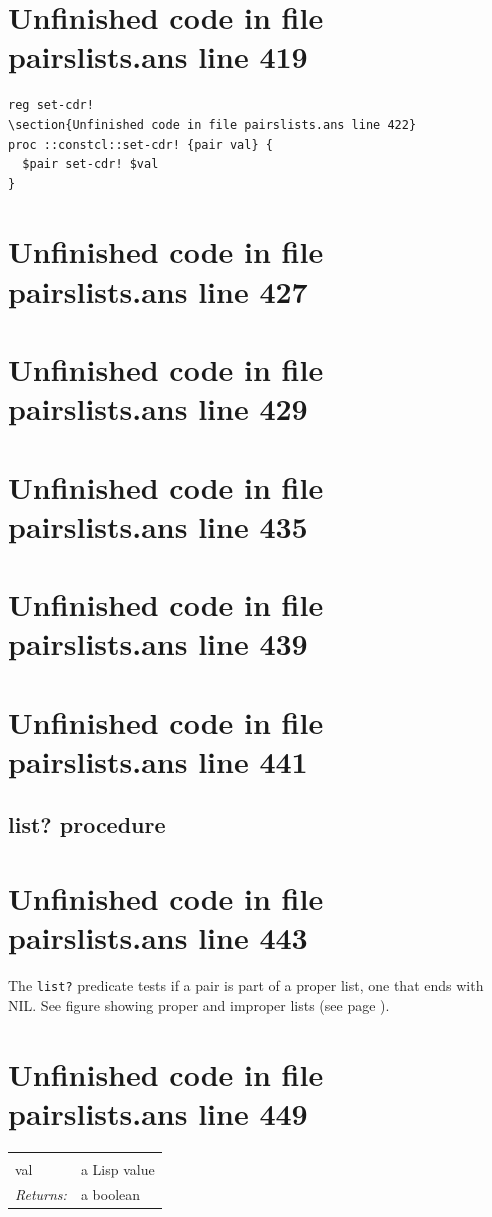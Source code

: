 \documentclass[twoside,9pt]{report}
\begin{document}
\section{Unfinished code in file pairslists.ans line 419}
\begin{lstlisting}
reg set-cdr!
\section{Unfinished code in file pairslists.ans line 422}
proc ::constcl::set-cdr! {pair val} {
  $pair set-cdr! $val
}
\end{lstlisting}
\section{Unfinished code in file pairslists.ans line 427}
\section{Unfinished code in file pairslists.ans line 429}
\section{Unfinished code in file pairslists.ans line 435}
\section{Unfinished code in file pairslists.ans line 439}
\section{Unfinished code in file pairslists.ans line 441}
\subsection{list? procedure}
\label{list?-procedure}
\section{Unfinished code in file pairslists.ans line 443}


The \texttt{list?} predicate tests if a pair is part of a proper list, one that ends with NIL. See figure showing proper and improper lists (see page \pageref{fig:-a-proper-list-and-two-improper-ones}).

\section{Unfinished code in file pairslists.ans line 449}
\noindent\begin{tabular}{ |p{1.9cm} p{8cm}| }
\hline
\rowcolor[HTML]{CCCCCC} \multicolumn{2}{|l|}{\bf list? (public)} \\
val & a Lisp value \\
\textit{Returns:} & a boolean \\
\hline
\end{tabular}
\end{document}
